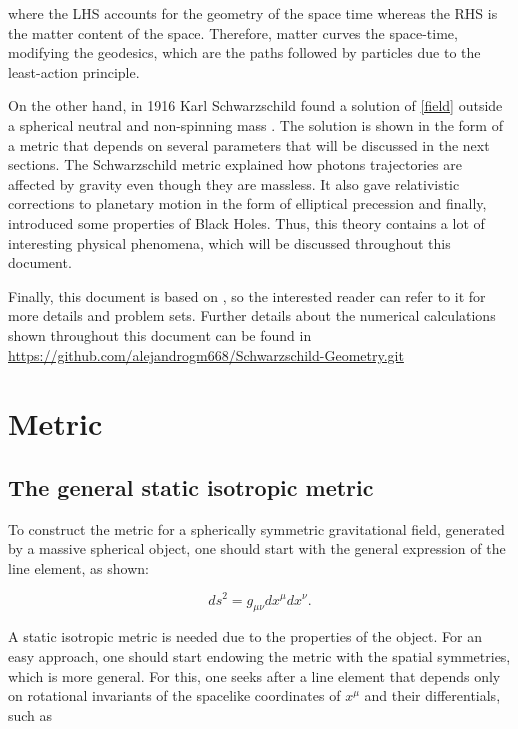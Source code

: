 \documentclass[letterpaper,11pt,onecolumn]{article}
\begin{document}
where the LHS accounts for the geometry of the space time whereas the RHS is the matter content of the space. Therefore, matter curves the space-time, modifying the geodesics, which are the paths followed by particles due to the least-action principle. 

On the other hand, in 1916 Karl Schwarzschild found a solution of \ref{field} outside a spherical neutral and non-spinning mass \cite{1916SPAW.......189S}. The solution is shown in the form of a metric that depends on several parameters that will be discussed in the next sections. The Schwarzschild metric explained how photons trajectories are affected by gravity even though they are massless. It also gave relativistic corrections to planetary motion in the form of elliptical precession and finally, introduced some properties of Black Holes. Thus, this theory contains a lot of interesting physical phenomena, which will be discussed throughout this document. 

Finally, this document is based on \cite{hobson_efstathiou_lasenby_2006}, so the interested reader can refer to it for more details and problem sets. Further details about the numerical calculations shown throughout this document can be found in \url{https://github.com/alejandrogm668/Schwarzschild-Geometry.git}

\section{Metric}\label{metric}

\subsection{The general static isotropic metric}

To construct the metric for a spherically symmetric gravitational field, generated by a massive spherical object, one should start with the general expression of the line element, as shown:

\begin{equation}
d s^{2}=g_{\mu \nu} d x^{\mu} d x^{\nu}\label{lineelement}.
\end{equation}

A static isotropic metric is needed due to the properties of the object. For an easy approach, one should start endowing the metric with the spatial symmetries, which is more general. For this, one seeks after a line element that depends only on rotational invariants of the spacelike coordinates of $x^\mu$ and their differentials, such as
\end{document}
